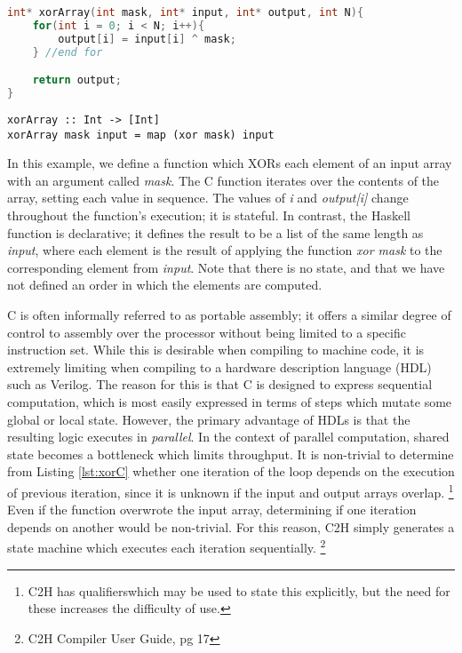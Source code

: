 \documentclass[english,onecolumn]{article}
\begin{document}
\begin{lstlisting}[language=C, caption={XORing an array in C.}, label={lst:xorC}]
int* xorArray(int mask, int* input, int* output, int N){
    for(int i = 0; i < N; i++){
        output[i] = input[i] ^ mask;
    } //end for

    return output;
}
\end{lstlisting}

\begin{lstlisting}[caption={XORing an array in Haskell.}, label={lst:xorH}]
xorArray :: Int -> [Int]
xorArray mask input = map (xor mask) input
\end{lstlisting}

In this example, we define a function which XORs each element of an input array with an argument called \textit{mask}. The C function iterates over the contents of the array, setting each value in sequence. The values of \textit{i} and \textit{output[i]} change throughout the function's execution; it is stateful. In contrast, the Haskell function is declarative; it defines the result to be a list of the same length as \textit{input}, where each element is the result of applying the function \textit{xor mask} to the corresponding element from \textit{input}. Note that there is no state, and that we have not defined an order in which the elements are computed.

C is often informally referred to as portable assembly; it offers a similar degree of control to assembly over the processor without being limited to a specific instruction set. While this is desirable when compiling to machine code, it is extremely limiting when compiling to a hardware description language (HDL) such as Verilog.
The reason for this is that C is designed to express sequential computation, which is most easily expressed in terms of steps which mutate some global or local state. However, the primary advantage of HDLs is that the resulting logic executes in \textit{parallel}. In the context of parallel computation, shared state becomes a bottleneck which limits throughput.
It is non-trivial to determine from Listing \ref{lst:xorC} whether one iteration of the loop depends on the execution of previous iteration, since it is unknown if the input and output arrays overlap.%
\footnote{C2H has qualifiers\footnotemark which may be used to state this explicitly, but the need for these increases the difficulty of use.}
Even if the function overwrote the input array, determining if one iteration depends on another would be non-trivial. For this reason, C2H simply generates a state machine which executes each iteration sequentially.%
\footnote{C2H Compiler User Guide, pg 17}
\end{document}
